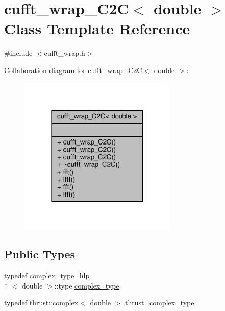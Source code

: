 \hypertarget{classcufft__wrap__C2C_3_01double_01_4}{\section{cufft\-\_\-wrap\-\_\-\-C2\-C$<$ double $>$ Class Template Reference}
\label{classcufft__wrap__C2C_3_01double_01_4}
}


{\ttfamily \#include $<$cufft\-\_\-wrap.\-h$>$}



Collaboration diagram for cufft\-\_\-wrap\-\_\-\-C2\-C$<$ double $>$\-:\nopagebreak
\begin{figure}[H]
\begin{center}
\leavevmode
\includegraphics[width=214pt]{classcufft__wrap__C2C_3_01double_01_4__coll__graph}
\end{center}
\end{figure}
\subsection*{Public Types}
\begin{DoxyCompactItemize}
\item 
typedef \hyperlink{structcomplex__type__hlp}{complex\-\_\-type\-\_\-hlp}\\*
$<$ double $>$\-::type \hyperlink{classcufft__wrap__C2C_3_01double_01_4_a6813a47168c043bdbf7ca39cb44e16ca}{complex\-\_\-type}
\item 
typedef \hyperlink{test__deflation__typedefs_8h_a25cabcac5deb559feab415e2c445d8ba}{thrust\-::complex}$<$ double $>$ \hyperlink{classcufft__wrap__C2C_3_01double_01_4_a61adb083b7093ac3b77aea1e52f85107}{thrust\-\_\-complex\-\_\-type}
\end{DoxyCompactItemize}
